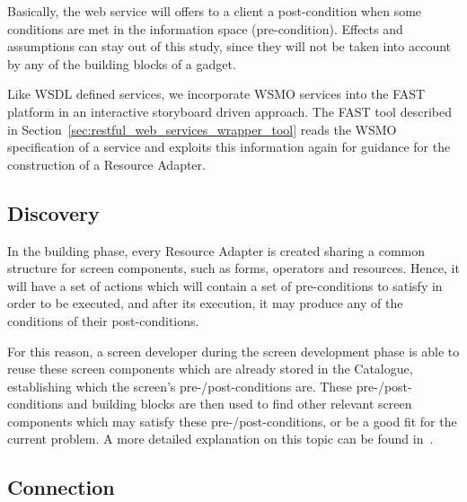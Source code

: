 \documentclass{fast_latex}
\begin{document}
Basically, the web service will offers to a client a post-condition when some conditions are met in the information space (pre-condition). Effects and assumptions can stay out of this study, since they will not be taken into account by any of the building blocks of a gadget.

Like WSDL defined services, we incorporate WSMO services into the FAST platform in an interactive storyboard driven approach. The FAST tool described in Section~\ref{sec:restful_web_services_wrapper_tool} reads the WSMO specification of a service and exploits this information again for guidance for the construction of a Resource Adapter. 


\subsection{Discovery} %
\label{sub:discovery}

In the building phase, every Resource Adapter is created sharing a common structure for screen components, such as forms, operators and resources. Hence, it will have a set of actions which will contain a set of pre-conditions to satisfy in order to be executed, and after its execution, it may produce any of the conditions of their post-conditions.

For this reason, a screen developer during the screen development phase is able to reuse these screen components which are already stored in the Catalogue, establishing which the screen's pre-/post-conditions are. These pre-/post-conditions and building blocks are then used to find other relevant screen components which may satisfy these pre-/post-conditions, or be a good fit for the current problem. A more detailed explanation on this topic can be found in~\cite{rivera2011catalogue_user_manual}.


\subsection{Connection} %
\label{sub:connection}
\end{document}
